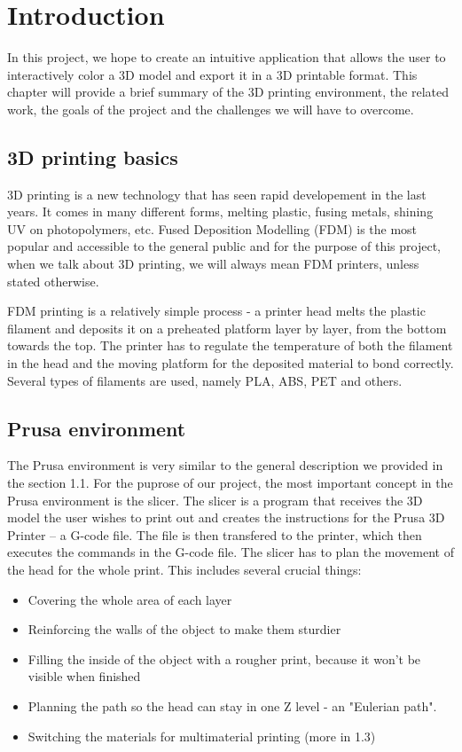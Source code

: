 \chapter{Introduction}

In this project, we hope to create an intuitive application that allows the user to interactively color a 3D model and export it in a 3D printable format. This chapter will provide a brief summary of the 3D printing environment, the related work, the goals of the project and the challenges we will have to overcome.

\section{3D printing basics}

3D printing is a new technology that has seen rapid developement in the last years. It comes in many different forms, melting plastic, fusing metals, shining UV on photopolymers, etc. Fused Deposition Modelling (FDM) is the most popular and accessible to the general public and for the purpose of this project, when we talk about 3D printing, we will always mean FDM printers, unless stated otherwise.

FDM printing is a relatively simple process - a printer head melts the plastic filament and deposits it on a preheated platform layer by layer, from the bottom towards the top. The printer has to regulate the temperature of both the filament in the head and the moving platform for the deposited material to bond correctly. Several types of filaments are used, namely PLA, ABS, PET and others.

\section{Prusa environment}

The Prusa environment is very similar to the general description we provided in the section 1.1. For the puprose of our project, the most important concept in the Prusa environment is the slicer. The slicer is a program that receives the 3D model the user wishes to print out and creates the instructions for the Prusa 3D Printer -- a G-code file. The file is then transfered to the printer, which then executes the commands in the G-code file. The slicer has to plan the movement of the head for the whole print. This includes several crucial things:

\begin{itemize}
\item Covering the whole area of each layer
\item Reinforcing the walls of the object to make them sturdier
\item Filling the inside of the object with a rougher print, because it won't be visible when finished
\item Planning the path so the head can stay in one Z level - an "Eulerian path".
\item Switching the materials for multimaterial printing (more in 1.3)
\end{itemize}

